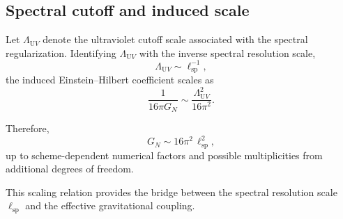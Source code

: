 \subsection{Spectral cutoff and induced scale}
  \label{subsec:spectral-cutoff}

  Let $\Lambda_{\mathrm UV}$ denote the ultraviolet cutoff scale associated with
  the spectral regularization.
  Identifying $\Lambda_{\mathrm UV}$ with the inverse spectral resolution scale,
  \begin{equation}
    \Lambda_{\mathrm UV} \sim \ell_{\mathrm{sp}}^{-1},
  \end{equation}
  the induced Einstein--Hilbert coefficient scales as
  \begin{equation}
    \frac{1}{16\pi G_N}
    \sim
    \frac{\Lambda_{\mathrm UV}^2}{16\pi^2}.
  \end{equation}

  Therefore,
  \begin{equation}
    G_N
    \sim
    16\pi^2 \, \ell_{\mathrm{sp}}^2,
  \end{equation}
  up to scheme-dependent numerical factors and possible multiplicities
  from additional degrees of freedom.

  This scaling relation provides the bridge between the spectral resolution
  scale $\ell_{\mathrm{sp}}$ and the effective gravitational coupling.
